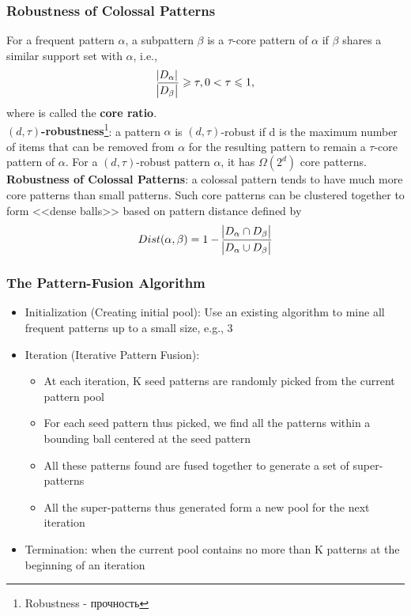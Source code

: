 \subsubsection{Robustness of Colossal Patterns}
For a frequent pattern $\alpha$, a subpattern $\beta$ is a $\tau$-core pattern of $\alpha$ if $\beta$ shares a similar support set with $\alpha$, i.e., 
\begin{equation*}
\frac{\abs{D_\alpha}}{\abs{D_\beta}} \geqslant \tau, 0 < \tau \leqslant 1, 
\end{equation*}
where \tau is called the \textbf{core ratio}.\\

\textbf{$(d, \tau)$-robustness}\footnote{Robustness - прочность}: a pattern $\alpha$ is $(d, \tau)$-robust if d is the maximum number of items that can be removed from $\alpha$ for the resulting pattern to remain a $\tau$-core pattern of $\alpha$. For a $(d, \tau)$-robust pattern $\alpha$, it has $\Omega (2^d)$ core patterns.\\

\textbf{Robustness of Colossal Patterns}: a colossal pattern tends to have
much more core patterns than small patterns. Such core patterns can be clustered together to form <<dense balls>> based on pattern distance defined by 
\begin{equation*}
Dist(\alpha, \beta)=1-\frac{\abs{D_\alpha \cap D_\beta}}{\abs{D_\alpha \cup D_\beta}}
\end{equation*}

\subsubsection{The Pattern-Fusion Algorithm}
\begin{itemize}
\item Initialization (Creating initial pool): Use an existing algorithm to mine all frequent patterns up to a small size, e.g., 3
\item Iteration (Iterative Pattern Fusion):
\begin{itemize}
\item At each iteration, K seed patterns are randomly picked from the current pattern
pool
\item For each seed pattern thus picked, we find all the patterns within a bounding ball centered at the seed pattern
\item All these patterns found are fused together to generate a set of super-patterns
\item All the super-patterns thus generated form a new pool for the next iteration
\end{itemize}
\item Termination: when the current pool contains no more than K patterns at the beginning of an iteration
\end{itemize}


